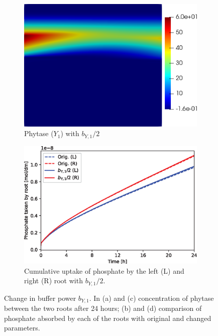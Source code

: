 \documentclass[11pt]{article}
\numberwithin{equation}{section}
\begin{document}
\begin{figure}[!htb]
\begin{subfigure}[t]{0.35\textwidth}
    \includegraphics[trim= 100 100 60 100,width=\textwidth]{Figures/Y1_bY1divby2.png}
    \caption{Phytase ($Y_1$) with $b_{Y,1} / 2$}
    \label{fig:numexp_by1down1}
\end{subfigure}
\hspace{1cm}
\begin{subfigure}[t]{0.4\textwidth}
    \includegraphics[width=\textwidth]{Figures/bY1divby2.eps}
    \caption{Cumulative uptake of phosphate by the left (L) and right (R) root with $b_{Y,1} / 2$.}
    \label{fig:numexp_by1down2}
\end{subfigure}
\caption{Change in buffer power $b_{Y,1}$. In (a) and (c) concentration of phytase between the two roots after 24 hours; (b) and (d) comparison of phosphate absorbed by each of the roots with original and changed parameters.}
\end{figure}
\end{document}
